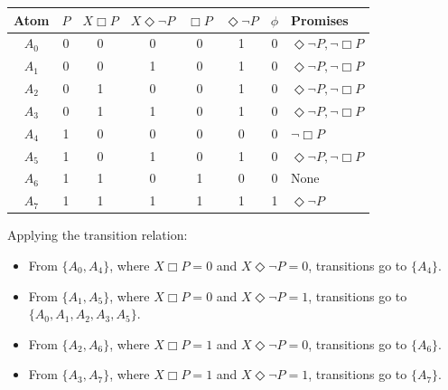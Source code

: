 \begin{center}
\renewcommand{\arraystretch}{1.2}
\begin{tabular}{c|ccc|ccc|l}
  Atom & $P$ & $X\Box P$ & $X\Diamond\neg P$ & $\Box P$ & $\Diamond\neg P$ & $\phi$ & Promises \\
  \hline
  $A_0$ & 0 & 0 & 0 & 0 & 1 & 0 & $\Diamond\neg P, \neg\Box P$ \\
  $A_1$ & 0 & 0 & 1 & 0 & 1 & 0 & $\Diamond\neg P, \neg\Box P$ \\
  $A_2$ & 0 & 1 & 0 & 0 & 1 & 0 & $\Diamond\neg P, \neg\Box P$ \\
  $A_3$ & 0 & 1 & 1 & 0 & 1 & 0 & $\Diamond\neg P, \neg\Box P$ \\
  $A_4$ & 1 & 0 & 0 & 0 & 0 & 0 & $\neg\Box P$ \\
  $A_5$ & 1 & 0 & 1 & 0 & 1 & 0 & $\Diamond\neg P, \neg\Box P$ \\
  $A_6$ & 1 & 1 & 0 & 1 & 0 & 0 & None \\
  $A_7$ & 1 & 1 & 1 & 1 & 1 & 1 & $\Diamond\neg P$ \\
\end{tabular}
\end{center}

Applying the transition relation:
\begin{itemize}[nosep]
  \item From $\{A_0, A_4\}$, where $X\Box P=0$ and
  $X\Diamond\neg P=0$, transitions go to $\{A_4\}$.
  \item From $\{A_1, A_5\}$, where $X\Box P=0$ and
  $X\Diamond\neg P=1$, transitions go to
  $\{A_0, A_1, A_2, A_3, A_5\}$.
  \item From $\{A_2, A_6\}$, where $X\Box P=1$ and
  $X\Diamond\neg P=0$, transitions go to $\{A_6\}$.
  \item From $\{A_3, A_7\}$, where $X\Box P=1$ and
  $X\Diamond\neg P=1$, transitions go to $\{A_7\}$.
\end{itemize}

